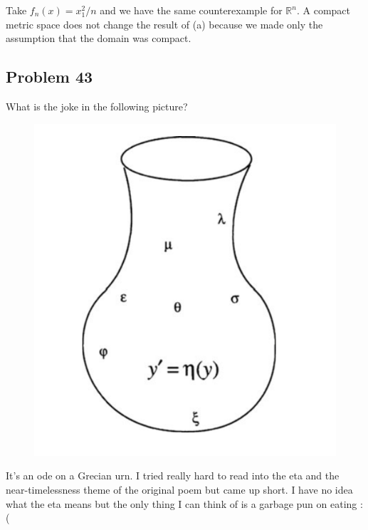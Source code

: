\documentclass{amsart}
\begin{document}
\medskip \noindent Take $f_n(x) = x_1^2/n$ and we have the same counterexample for $\mathbb{R}^n$. A compact metric 
space does not change the result of (a) because we made only the assumption that the domain was compact.

\newpage

\subsection*{Problem 43} What is the joke in the following picture?

\bigskip

\begin{figure}[h]
    \centering
    \includegraphics{joke.png}
\end{figure}

It's an ode on a Grecian urn. I tried really hard to read into the eta and the near-timelessness theme of the original
poem but came up short. I have no idea what the eta means but the only thing I can think of is a garbage
pun on eating :(
\end{document}
